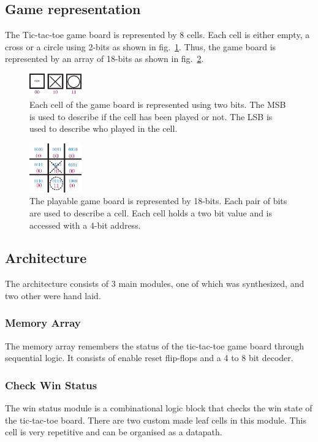\documentclass[]{article}
\begin{document}
\subsection{Game representation}
The Tic-tac-toe game board is represented by 8 cells. Each cell is either empty, a cross or a circle using 2-bits as shown in fig.~\ref{fig:cell-representation}. Thus, the game board is represented by an array of 18-bits as shown in fig.~\ref{fig:gBoard-representation}.

\begin{figure}[b]
\centering
\includegraphics[width=0.2\textwidth]{cell-representation}
\caption{Each cell of the game board is represented using two bits. The MSB is used to describe if the cell has been played or not. The LSB is used to describe who played in the cell.}
\label{fig:cell-representation}
\end{figure}

\begin{figure}[ht]
\centering
\includegraphics[width=0.2\textwidth]{gBoard-representation}
\caption{The playable game board is represented by 18-bits. Each pair of bits are used to describe a cell. Each cell holds a two bit value and is accessed with a 4-bit address.}
\label{fig:gBoard-representation}
\end{figure}

\subsection{Architecture}
The architecture consists of 3 main modules, one of which was synthesized, and two other were hand laid.

\subsubsection{Memory Array}
The memory array remembers the status of the tic-tac-toe game board through sequential logic. It consists of enable reset flip-flops and a 4 to 8 bit decoder.
\subsubsection{Check Win Status}
The win status module is a combinational logic block that checks the win state of the tic-tac-toe board. There are two custom made leaf cells in this module. This cell is very repetitive and can be organised as a datapath.
\end{document}
